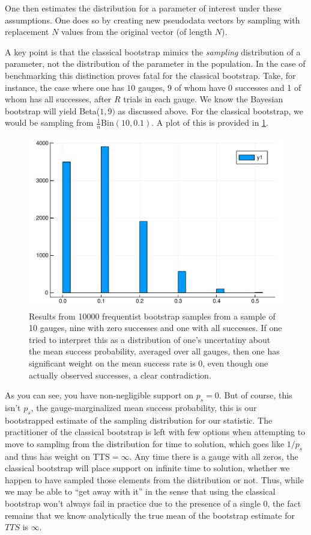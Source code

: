 One then estimates the distribution for a parameter of interest under these assumptions. One does so by creating new pseudodata vectors by sampling with replacement $N$ values from the original vector (of length $N$).

A key point is that the classical bootstrap mimics the \emph{sampling} distribution of a parameter, not the distribution of the parameter in the population. In the case of benchmarking this distinction proves fatal for the classical bootstrap. Take, for instance, the case where one has $10$ gauges, $9$ of whom have $0$ successes and 1 of whom has all successes, after $R$ trials in each gauge. We know the Bayesian bootstrap will yield Beta($1,9)$ as discussed above. For the classical bootstrap, we would be sampling from $\frac1n \mathrm{Bin}(10,0.1)$. A plot of this is provided in \ref{fig:cbsucks}.

\begin{figure}[hbt]
  \includegraphics[width=\columnwidth]{chapters/Benchmarking/cbsucks}
  \caption{Results from 10000 frequentist bootstrap samples from a sample of 10 gauges, nine with zero successes and one with all successes. If one tried to interpret this as a distribution of one's uncertatiny about the mean success probability, averaged over all gauges, then one has significant weight on the mean success rate is 0, even though one actually observed successes, a clear contradiction.}
  \label{fig:cbsucks}
\end{figure}

As you can see, you have non-negligible support on $p_s=0$. But of course, this isn't $p_s$, the gauge-marginalized mean success probability, this is our bootstrapped estimate of the sampling distribution for our statistic. The practitioner of the classical bootstrap is left with few options when attempting to move to sampling from the distribution for time to solution, which goes like $1/p_s$ and thus has weight on TTS$=\infty$. Any time there is a gauge with all zeros, the classical bootstrap will place support on infinite time to solution, whether we happen to have sampled those elements from the distribution or not. Thus, while we may be able to ``get away with it'' in the sense that using the classical bootstrap won't always fail in practice due to the presence of a single $0$, the fact remains that we know analytically the true mean of the bootstrap estimate for $TTS$ is $\infty$.

